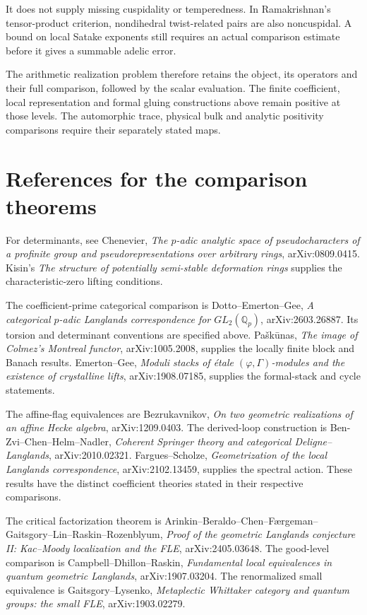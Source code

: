 It does not supply missing cuspidality or temperedness.
In Ramakrishnan's tensor-product criterion, nondihedral
twist-related pairs are also noncuspidal.
A bound on local Satake exponents still requires an actual
comparison estimate before it gives a summable adelic error.

The arithmetic realization problem therefore retains the object,
its operators and their full comparison, followed by the scalar
evaluation. The finite coefficient, local representation and
formal gluing constructions above remain positive at those
levels. The automorphic trace, physical bulk and analytic
positivity comparisons require their separately stated maps.

\section*{References for the comparison theorems}

For determinants, see Chenevier,
\emph{The \(p\)-adic analytic space of pseudocharacters
of a profinite group and pseudorepresentations over arbitrary rings},
arXiv:0809.0415.
Kisin's \emph{The structure of potentially semi-stable deformation rings}
supplies the characteristic-zero lifting conditions.

The coefficient-prime categorical comparison is
Dotto--Emerton--Gee, \emph{A categorical \(p\)-adic Langlands
correspondence for \(GL_2(\mathbb Q_p)\)}, arXiv:2603.26887.
Its torsion and determinant conventions are specified above.
Pa\v{s}k\={u}nas, \emph{The image of Colmez's Montreal functor},
arXiv:1005.2008, supplies the locally finite block and Banach results.
Emerton--Gee, \emph{Moduli stacks of étale \((\varphi,\Gamma)\)-modules
and the existence of crystalline lifts}, arXiv:1908.07185,
supplies the formal-stack and cycle statements.

The affine-flag equivalences are Bezrukavnikov,
\emph{On two geometric realizations of an affine Hecke algebra},
arXiv:1209.0403.
The derived-loop construction is Ben-Zvi--Chen--Helm--Nadler,
\emph{Coherent Springer theory and categorical Deligne--Langlands},
arXiv:2010.02321.
Fargues--Scholze, \emph{Geometrization of the local Langlands correspondence},
arXiv:2102.13459, supplies the spectral action.
These results have the distinct coefficient theories stated in their respective comparisons.

The critical factorization theorem is Arinkin--Beraldo--Chen--F{\ae}rgeman--Gaitsgory--Lin--Raskin--Rozenblyum,
\emph{Proof of the geometric Langlands conjecture II:
Kac--Moody localization and the FLE}, arXiv:2405.03648.
The good-level comparison is Campbell--Dhillon--Raskin,
\emph{Fundamental local equivalences in quantum geometric Langlands},
arXiv:1907.03204.
The renormalized small equivalence is Gaitsgory--Lysenko,
\emph{Metaplectic Whittaker category and quantum groups:
the small FLE}, arXiv:1903.02279.

